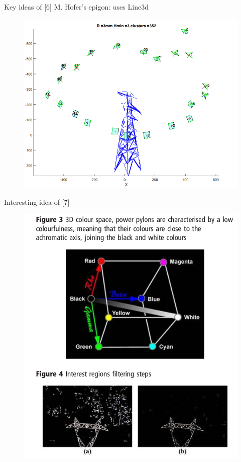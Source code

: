 \documentclass{beamer}
\begin{document}
\begin{frame}[t, fragile]{Key ideas of [6]}
M. Hofer's epigon: uses Line3d

\begin{figure}
\centering
\includegraphics[scale=0.25]{morrarjee}
\end{figure}
\end{frame}

\begin{frame}[t, fragile]{Interesting idea of [7]}
\begin{figure}
\centering
\includegraphics[scale=0.23]{colorful}
\end{figure}
\end{frame}
\end{document}
